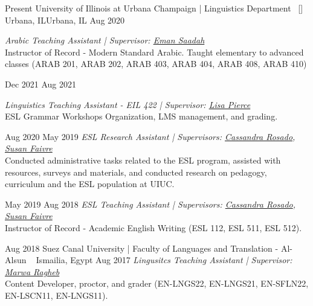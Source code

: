 
\begin{experiences}

\researchexperience
    {Present}   {University of Illinois at Urbana Champaign | Linguistics Department{\normalfont  ~ [\href{https://linguistics.illinois.edu/}{\small{\websiteSymbol}}]
    }}{Urbana, IL}{Urbana, IL}
    {Aug 2020} {\textit{Arabic Teaching Assistant | Supervisor: \href{https://linguistics.illinois.edu/directory/profile/esaadah2} {Eman Saadah} }\\
    Instructor of Record - Modern Standard Arabic. Taught elementary to advanced classes (ARAB 201, ARAB 202, ARAB 403, ARAB 404, ARAB 408, ARAB 410)
    \vskip 0.1cm

    }
\researchexperience
    {Dec 2021}   {}{}{}
    {Aug 2021} {\textit{Linguistics Teaching Assistant - EIL 422 | Supervisor: \href{https://www.linkedin.com/in/lisa-r-pierce-15363a15/} {Lisa Pierce} }\\
    ESL Grammar Workshops Organization, LMS management, and grading.
    \vskip 0.1cm

    }
\researchexperience
    {Aug 2020}   {}{}{}
    {May 2019} {\textit{ESL Research Assistant | Supervisors:  \href{https://linguistics.illinois.edu/directory/profile/crosado2}{Cassandra Rosado}, 
    \href{https://linguistics.illinois.edu/directory/profile/sfaivre}{Susan Faivre}
    }\\
Conducted administrative tasks related to the ESL program, assisted with resources, surveys and materials, and conducted research on pedagogy, curriculum and the ESL population at UIUC.
    }
    
    \researchexperience
    {May 2019}   {}{}{}
    {Aug 2018} {\textit{ESL Teaching Assistant | Supervisors:  \href{https://linguistics.illinois.edu/directory/profile/crosado2}{Cassandra Rosado}, 
    \href{https://linguistics.illinois.edu/directory/profile/sfaivre}{Susan Faivre}
    }\\
     Instructor of Record - Academic English Writing (ESL 112, ESL 511, ESL 512).
    }

  \emptySeparator
   \researchexperience
    {Aug 2018}   {Suez Canal University | Faculty of Languages and Translation - Al-Alsun {\normalfont  ~ 
    }}{Ismailia, Egypt}{}
    {Aug 2017} {\textit{Lingusitcs Teaching Assistant | Supervisor: \href{https://www.researchgate.net/profile/Marwa-Ragheb-2}{Marwa Ragheb}}\\
    Content Developer, proctor, and grader (EN-LNGS22, EN-LNGS21,
EN-SFLN22, EN-LSCN11, EN-LNGS11).
    }


\end{experiences}
